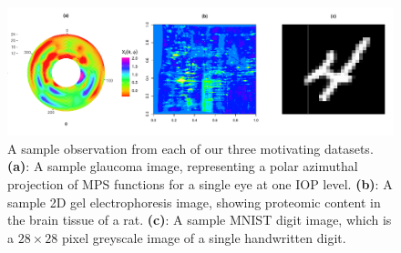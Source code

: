 \begin{figure}
    \centering
    \includegraphics[width=1\textwidth]{figures/data-plot.pdf}
    \caption{
    A sample observation from each of our three motivating datasets.
    \textbf{(a)}: A sample glaucoma image, representing a polar azimuthal projection of MPS functions for a single eye at one IOP level.
    \textbf{(b)}: A sample 2D gel electrophoresis image, showing proteomic content in the brain tissue of a rat.
    \textbf{(c)}: A sample MNIST digit image, which is a $28 \times 28$ pixel greyscale image of a single handwritten digit.}
    \label{fig:combined-data-objects}
\end{figure}